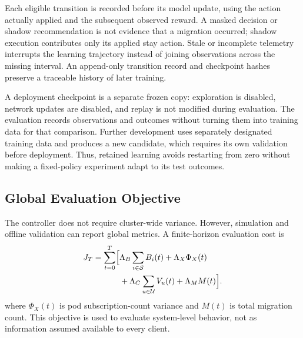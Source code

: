 \documentclass[manuscript,nonacm]{acmart}
\begin{document}
Each eligible transition is recorded before its model update, using the
action actually applied and the subsequent observed reward. A masked decision
or shadow recommendation is not evidence that a migration occurred; shadow
execution contributes only its applied stay action. Stale or incomplete
telemetry interrupts the learning trajectory instead of joining observations
across the missing interval. An append-only transition record and checkpoint
hashes preserve a traceable history of later training.

A deployment checkpoint is a separate frozen copy: exploration is disabled,
network updates are disabled, and replay is not modified during evaluation.
The evaluation records observations and outcomes without turning them into
training data for that comparison. Further development uses separately
designated training data and produces a new candidate, which requires its own
validation before deployment. Thus, retained learning avoids restarting from
zero without making a fixed-policy experiment adapt to its test outcomes.

\subsection{Global Evaluation Objective}

The controller does not require cluster-wide variance. However, simulation and
offline validation can report global metrics. A finite-horizon evaluation cost
is
\begin{align}
	J_T =
	\sum_{t=0}^{T}
	\Bigl[
	&\Lambda_B \sum_{i\in\mathcal{S}}B_i(t)
	+\Lambda_X \Phi_X(t) \nonumber\\
	&+\Lambda_C \sum_{u\in\mathcal{U}}V_u(t)
	+\Lambda_M M(t)
	\Bigr].
\end{align}
where $\Phi_X(t)$ is pod subscription-count variance and $M(t)$ is total
migration count. This objective is used to evaluate system-level behavior, not
as information assumed available to every client.
\end{document}
